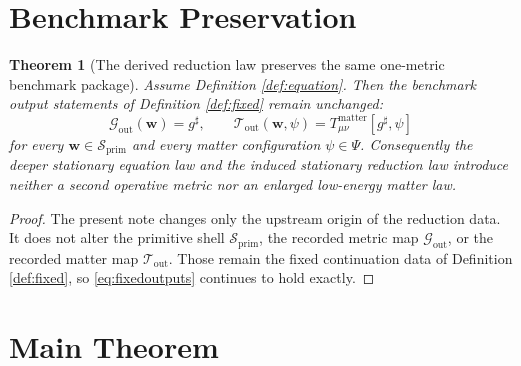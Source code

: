 \documentclass[11pt]{article}
\newcommand{\CompletedMetric}{g^{\sharp}}
\newcommand{\PrimShell}{\mathcal S_{\mathrm{prim}}}
\newcommand{\MetricOut}{\mathscr G_{\mathrm{out}}}
\newcommand{\MatterOut}{\mathscr T_{\mathrm{out}}}
\newtheorem{theorem}{Theorem}
\begin{document}
\section{Benchmark Preservation}

\begin{theorem}[The derived reduction law preserves the same one-metric benchmark package]
\label{thm:outputs}
Assume Definition \ref{def:equation}. Then the benchmark output statements of Definition \ref{def:fixed} remain unchanged:
\[
\MetricOut(\mathbf w)=\CompletedMetric,
\qquad
\MatterOut(\mathbf w,\psi)
=
T_{\mu\nu}^{\mathrm{matter}}[\CompletedMetric,\psi]
\]
for every \(\mathbf w\in\PrimShell\) and every matter configuration \(\psi\in\Psi\). Consequently the deeper stationary equation law and the induced stationary reduction law introduce neither a second operative metric nor an enlarged low-energy matter law.
\end{theorem}

\begin{proof}
The present note changes only the upstream origin of the reduction data. It does not alter the primitive shell \(\PrimShell\), the recorded metric map \(\MetricOut\), or the recorded matter map \(\MatterOut\). Those remain the fixed continuation data of Definition \ref{def:fixed}, so \eqref{eq:fixedoutputs} continues to hold exactly.
\end{proof}

\section{Main Theorem}
\end{document}
